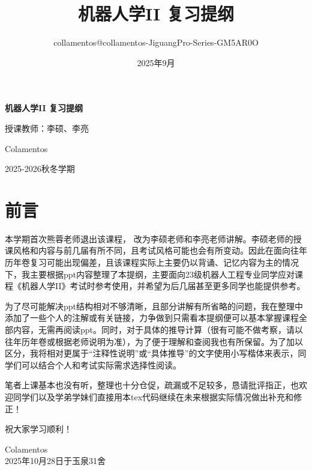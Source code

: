 \documentclass[a4paper,11pt]{article}
\title{机器人学II 复习提纲 \\ \vspace{0.5cm} \large }
\author{collamentos@collamentos-JiguangPro-Series-GM5AR0O}
\date{2025年9月}
\begin{document}
\begin{titlepage}
    \centering
    \vspace*{3cm}
    {\Huge \textbf{机器人学II 复习提纲} \par}
    \vspace{0.5cm}
    {\Large 授课教师：李硕、李亮\par}
    \vspace{3cm}
    {\Large Colamentos \par}
    {\Large 2025-2026秋冬学期 \par}
\end{titlepage}

\section*{前言}

本学期首次熊蓉老师退出该课程， 改为李硕老师和李亮老师讲解。李硕老师的授课风格和内容与前几届有所不同，且考试风格可能也会有所变动。因此在面向往年历年卷复习可能出现偏差，且该课程实际上主要仍以背诵、记忆内容为主的情况下，我主要根据ppt内容整理了本提纲，主要面向23级机器人工程专业同学应对课程《机器人学II》考试时参考使用，并希望为后几届甚至更多同学也能提供参考。

为了尽可能解决ppt结构相对不够清晰，且部分讲解有所省略的问题，我在整理中添加了一些个人的注解或有关链接，力争做到只需看本提纲便可以基本掌握课程全部内容，无需再阅读ppt。同时，对于具体的推导计算（很有可能不做考察，请以往年历年卷或根据老师说明为准），为了便于理解和查阅我也有所保留。为了加以区分，我将相对更属于“注释性说明”或“具体推导”的文字使用小写楷体来表示，同学们可以结合个人和考试实际需求选择性阅读。

笔者上课基本也没有听，整理也十分仓促，疏漏或不足较多，恳请批评指正，也欢迎同学们以及学弟学妹们直接用本tex代码继续在未来根据实际情况做出补充和修正！

祝大家学习顺利！

\begin{flushright}
Colamentos\\
2025年10月28日于玉泉31舍
\end{flushright}
\newpage
\tableofcontents
\thispagestyle{empty}
\newpage








\end{document}
